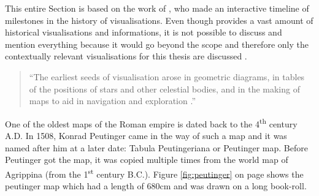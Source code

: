 This entire Section is based on the work of \citeauthor{Friendly.2001}, who made an interactive timeline of milestones in the history of visualisations. Even though \citeauthor{Friendly.2001} provides a vast amount of historical visualisations and informations, it is not possible to discuss and mention everything because it would go beyond the scope and therefore only the contextually relevant visualisations for this thesis are discussed .

\begin{quote}
    ``The earliest seeds of visualisation arose in geometric diagrams, in tables of the positions of stars and other celestial bodies, and in the making of maps to aid in navigation and exploration .''
\end{quote}

One of the oldest maps of the Roman empire is dated back to the 4\textsuperscript{th} century A.D. In 1508, Konrad Peutinger came in the way of such a map and it was named after him at a later date: Tabula Peutingeriana or Peutinger map. Before Peutinger got the map, it was copied multiple times from the world map of Agrippina (from the 1\textsuperscript{st} century B.C.). Figure \ref{fig:peutinger} on page \pageref{fig:peutinger} shows the peutinger map which had a length of 680cm and was drawn on a long book-roll.

